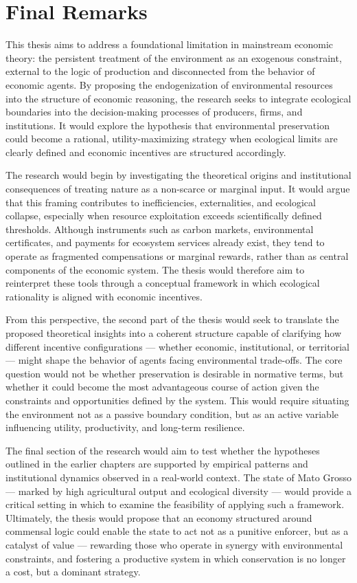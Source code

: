 

\section{Final Remarks}

This thesis aims to address a foundational limitation in mainstream economic theory: the persistent treatment of the environment as an exogenous constraint, external to the logic of production and disconnected from the behavior of economic agents. By proposing the endogenization of environmental resources into the structure of economic reasoning, the research seeks to integrate ecological boundaries into the decision-making processes of producers, firms, and institutions. It would explore the hypothesis that environmental preservation could become a rational, utility-maximizing strategy when ecological limits are clearly defined and economic incentives are structured accordingly.

The research would begin by investigating the theoretical origins and institutional consequences of treating nature as a non-scarce or marginal input. It would argue that this framing contributes to inefficiencies, externalities, and ecological collapse, especially when resource exploitation exceeds scientifically defined thresholds. Although instruments such as carbon markets, environmental certificates, and payments for ecosystem services already exist, they tend to operate as fragmented compensations or marginal rewards, rather than as central components of the economic system. The thesis would therefore aim to reinterpret these tools through a conceptual framework in which ecological rationality is aligned with economic incentives.

From this perspective, the second part of the thesis would seek to translate the proposed theoretical insights into a coherent structure capable of clarifying how different incentive configurations — whether economic, institutional, or territorial — might shape the behavior of agents facing environmental trade-offs. The core question would not be whether preservation is desirable in normative terms, but whether it could become the most advantageous course of action given the constraints and opportunities defined by the system. This would require situating the environment not as a passive boundary condition, but as an active variable influencing utility, productivity, and long-term resilience.

The final section of the research would aim to test whether the hypotheses outlined in the earlier chapters are supported by empirical patterns and institutional dynamics observed in a real-world context. The state of Mato Grosso — marked by high agricultural output and ecological diversity — would provide a critical setting in which to examine the feasibility of applying such a framework. Ultimately, the thesis would propose that an economy structured around commensal logic could enable the state to act not as a punitive enforcer, but as a catalyst of value — rewarding those who operate in synergy with environmental constraints, and fostering a productive system in which conservation is no longer a cost, but a dominant strategy.

